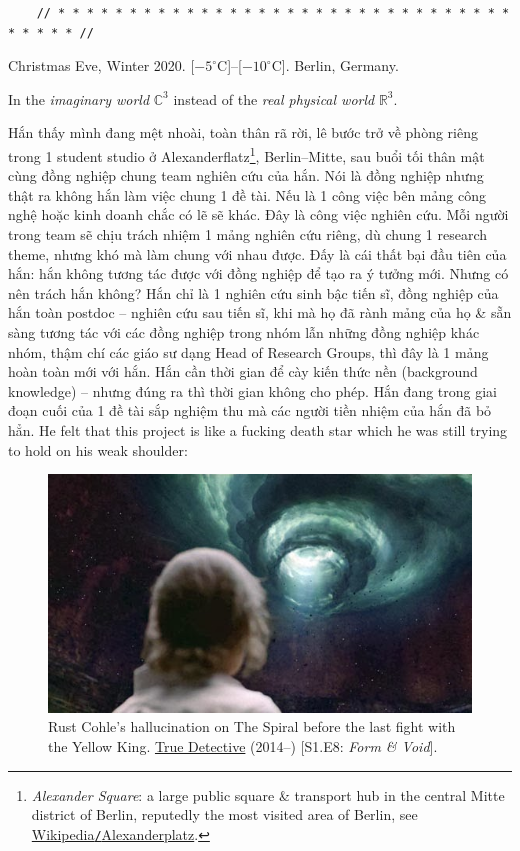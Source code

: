 \documentclass[12pt]{article}
\begin{document}
\begin{verbatim}
	// * * * * * * * * * * * * * * * * * * * * * * * * * * * * * * * * * * * * * //
\end{verbatim}

\begin{flushright}
	Christmas Eve, Winter 2020. [$-5^\circ$C]--[$-10^\circ$C]. Berlin, Germany.
	
	In the {\it imaginary world} $\mathbb{C}^3$ instead of the {\it real physical world} $\mathbb{R}^3$.
\end{flushright}
Hắn thấy mình đang mệt nhoài, toàn thân rã rời, lê bước trở về phòng riêng trong 1 student studio ở Alexanderflatz\footnote{ {\it Alexander Square}: a large public square \& transport hub in the central Mitte district of Berlin, reputedly the most visited area of Berlin, see \href{https://en.wikipedia.org/wiki/Alexanderplatz}{Wikipedia{\tt/}Alexanderplatz}.}, Berlin--Mitte, sau buổi tối thân mật cùng đồng nghiệp chung team nghiên cứu của hắn. Nói là đồng nghiệp nhưng thật ra không hắn làm việc chung 1 đề tài. Nếu là 1 công việc bên mảng công nghệ hoặc kinh doanh chắc có lẽ sẽ khác. Đây là công việc nghiên cứu. Mỗi người trong team sẽ chịu trách nhiệm 1 mảng nghiên cứu riêng, dù chung 1 research theme, nhưng khó mà làm chung với nhau được. Đấy là cái thất bại đầu tiên của hắn: hắn không tương tác được với đồng nghiệp để tạo ra ý tưởng mới. Nhưng có nên trách hắn không? Hắn chỉ là 1 nghiên cứu sinh bậc tiến sĩ, đồng nghiệp của hắn toàn postdoc -- nghiên cứu sau tiến sĩ, khi mà họ đã rành mảng của họ \& sẵn sàng tương tác với các đồng nghiệp trong nhóm lẫn những đồng nghiệp khác nhóm, thậm chí các giáo sư dạng Head of Research Groups, thì đây là 1 mảng hoàn toàn mới với hắn. Hắn cần thời gian để cày kiến thức nền (background knowledge) -- nhưng đúng ra thì thời gian không cho phép. Hắn đang trong giai đoạn cuối của 1 đề tài sắp nghiệm thu mà các người tiền nhiệm của hắn đã bỏ hẳn. He felt that this project is like a fucking death star which he was still trying to hold on his weak shoulder:
\begin{figure}[H]
	\centering
	\includegraphics[width = 15cm]{spiral}
	\caption{Rust Cohle's hallucination on The Spiral before the last fight with the Yellow King. \href{https://www.imdb.com/title/tt2356777/}{True Detective} (2014--) [S1.E8: {\it Form \& Void}].}
\end{figure}
\end{document}
